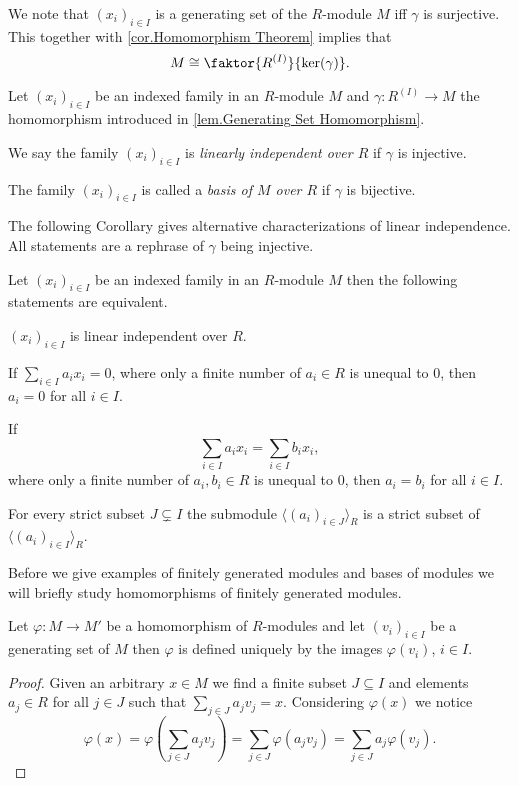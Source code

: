 We note that $(x_i)_{i\in I}$ is a generating set of the $R$-module $M$ iff $\gamma$ is surjective. This together with \cref{cor.Homomorphism Theorem} implies that 
\begin{equation*}
M\cong\faktor{R^{(I)}}{\ker(\gamma)}.
\end{equation*}


\begin{defin}
Let $(x_i)_{i\in I}$ be an indexed family in an $R$-mo\-dule $M$ and $\gamma\colon R^{(I)}\to M$ the homomorphism introduced in \cref{lem.Generating Set Homomorphism}.
\begin{thmlist}
\item We say the family $(x_i)_{i\in I}$ is \emph{linearly independent over $R$} if $\gamma$ is injective.
\item The family $(x_i)_{i\in I}$ is called a \emph{basis of $M$ over $R$} if $\gamma$ is bijective.
\end{thmlist}
\end{defin}
The following Corollary gives alternative characterizations of linear independence. All statements are a rephrase of $\gamma$ being injective.
\begin{cor}\label{lm.Linear Independence}
Let $(x_i)_{i\in I}$ be an indexed family in an $R$-module $M$ then the following statements are equivalent.
\begin{thmlist}
\item $(x_i)_{i\in I}$ is linear independent over $R$.
\item If $\sum_{i\in I}a_i x_i=0$, where only a finite number of $a_i\in R$ is unequal to 0, then $a_i=0$ for all $i\in I$.
\item If 
\[\sum_{i\in I}a_i x_i=\sum_{i\in I}b_i x_i,\]
where only a finite number of $a_i,b_i\in R$ is unequal to 0, then $a_i=b_i$ for all $i\in I$.\label{lm.All Scalars are 0}
\item For every strict subset $J\subsetneq I$ the submodule $\langle (a_i)_{i\in J}\rangle_R$ is a strict subset of $\langle (a_i)_{i\in I}\rangle_R$.
\end{thmlist}
\end{cor}

Before we give examples of finitely generated modules and bases of modules we will briefly study homomorphisms of finitely generated modules.

\begin{thm}\label{theo.Homomorphisms of free modules}
Let $\varphi\colon M\to M'$ be a homomorphism of $R$-modules and let $(v_i)_{i\in I}$ be a generating set of $M$ then $\varphi$ is defined uniquely by the images $\varphi(v_i)$, $i\in I$.
\end{thm}
\begin{proof}
Given an arbitrary $x\in M$ we find a finite subset $J\subseteq I$ and elements $a_j\in R$ for all $j\in J$ such that $\sum_{j\in J}a_j v_j=x$. Considering $\varphi(x)$ we notice
\begin{equation*}
\varphi(x)=\varphi\left(\sum_{j\in J}a_j v_j\right)=\sum_{j\in J}\varphi(a_jv_j)=\sum_{j\in J}a_j\varphi(v_j).
\end{equation*}
\end{proof}

